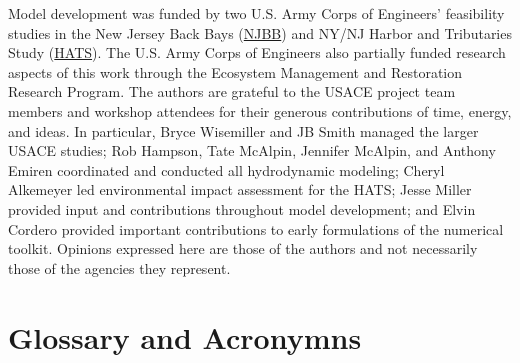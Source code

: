 \documentclass[
]{book}
\begin{document}
Model development was funded by two U.S. Army Corps of Engineers' feasibility studies in the New Jersey Back Bays (\href{https://www.nap.usace.army.mil/Missions/Civil-Works/New-Jersey-Back-Bays-Coastal-Storm-Risk-Management/}{NJBB}) and NY/NJ Harbor and Tributaries Study (\href{https://www.nan.usace.army.mil/Missions/Civil-Works/Projects-in-New-York/New-York-New-Jersey-Harbor-Tributaries-Focus-Area-Feasibility-Study/}{HATS}). The U.S. Army Corps of Engineers also partially funded research aspects of this work through the Ecosystem Management and Restoration Research Program. The authors are grateful to the USACE project team members and workshop attendees for their generous contributions of time, energy, and ideas. In particular, Bryce Wisemiller and JB Smith managed the larger USACE studies; Rob Hampson, Tate McAlpin, Jennifer McAlpin, and Anthony Emiren coordinated and conducted all hydrodynamic modeling; Cheryl Alkemeyer led environmental impact assessment for the HATS; Jesse Miller provided input and contributions throughout model development; and Elvin Cordero provided important contributions to early formulations of the numerical toolkit. Opinions expressed here are those of the authors and not necessarily those of the agencies they represent.

\hypertarget{glossary-and-acronymns}{%
\section*{Glossary and Acronymns}\label{glossary-and-acronymns}}
\end{document}

